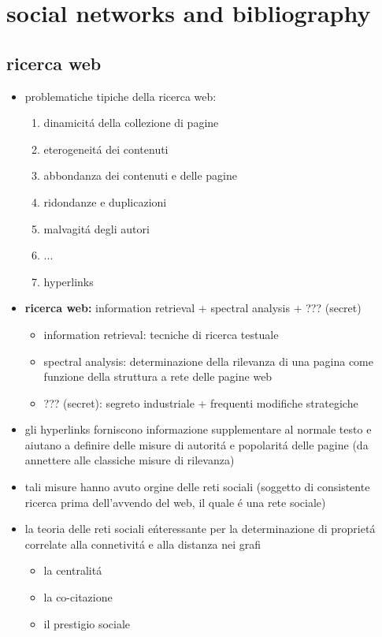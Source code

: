 \section*{social networks and bibliography}


\subsection*{ricerca web}
\begin{flushleft}
	\begin{itemize}
		\item problematiche tipiche della ricerca web:
		\begin{enumerate}
			\item dinamicit\'a della collezione di pagine
			\item eterogeneit\'a dei contenuti
			\item abbondanza dei contenuti e delle pagine
			\item ridondanze e duplicazioni
			\item malvagit\'a degli autori
			\item ...
			\item hyperlinks
		\end{enumerate}
		\item \textbf{ricerca web:} information retrieval + spectral analysis + ??? (secret)
		\begin{itemize}
			\item information retrieval: tecniche di ricerca testuale
			\item spectral analysis: determinazione della rilevanza di una pagina come funzione della struttura a rete delle pagine web
			\item ??? (secret): segreto industriale + frequenti modifiche strategiche
		\end{itemize}
		\item gli hyperlinks forniscono informazione supplementare al normale testo e aiutano a definire delle misure di autorit\'a e popolarit\'a delle pagine (da annettere alle classiche misure di rilevanza)
		\item tali misure hanno avuto orgine delle reti sociali (soggetto di consistente ricerca prima dell'avvendo del web, il quale \'e una rete sociale)
		\item la teoria delle reti sociali e\'nteressante per la determinazione di propriet\'a correlate alla connetivit\'a e alla distanza nei grafi
		\begin{itemize}
			\item la centralit\'a
			\item la co-citazione
			\item il prestigio sociale
		\end{itemize}
	\end{itemize}
\end{flushleft}

